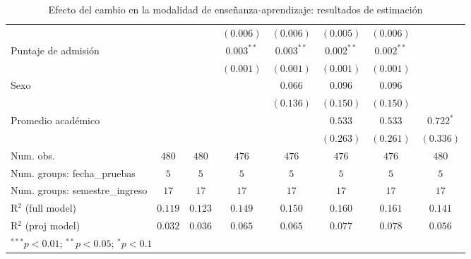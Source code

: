 \begin{table}
\begin{center}
\begin{tabular}{l c c c c c c c}
                               &                &               & $(0.006)$      & $(0.006)$      & $(0.005)$     & $(0.006)$     &               \\
Puntaje de admisión            &                &               & $0.003^{**}$   & $0.003^{**}$   & $0.002^{**}$  & $0.002^{**}$  &               \\
                               &                &               & $(0.001)$      & $(0.001)$      & $(0.001)$     & $(0.001)$     &               \\
Sexo                           &                &               &                & $0.066$        & $0.096$       & $0.096$       &               \\
                               &                &               &                & $(0.136)$      & $(0.150)$     & $(0.150)$     &               \\
Promedio académico             &                &               &                &                & $0.533$       & $0.533$       & $0.722^{*}$   \\
                               &                &               &                &                & $(0.263)$     & $(0.261)$     & $(0.336)$     \\
\hline
Num. obs.                      & $480$          & $480$         & $476$          & $476$          & $476$         & $476$         & $480$         \\
Num. groups: fecha\_pruebas    & $5$            & $5$           & $5$            & $5$            & $5$           & $5$           & $5$           \\
Num. groups: semestre\_ingreso & $17$           & $17$          & $17$           & $17$           & $17$          & $17$          & $17$          \\
R$^2$ (full model)             & $0.119$        & $0.123$       & $0.149$        & $0.150$        & $0.160$       & $0.161$       & $0.141$       \\
R$^2$ (proj model)             & $0.032$        & $0.036$       & $0.065$        & $0.065$        & $0.077$       & $0.078$       & $0.056$       \\
\hline
\multicolumn{8}{l}{\scriptsize{$^{***}p<0.01$; $^{**}p<0.05$; $^{*}p<0.1$}}
\end{tabular}
\caption{Efecto del cambio en la modalidad de enseñanza-aprendizaje: resultados de estimación}
\label{tab:regresiones_efectos_fijos}
\end{center}
\end{table}
